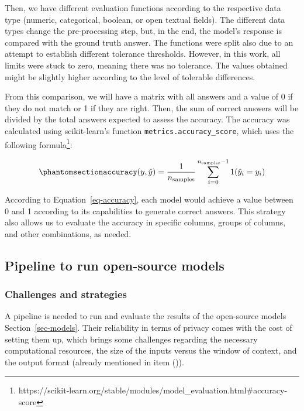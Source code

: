 \documentclass[
  12pt,
]{article}
\begin{document}
Then, we have different evaluation functions according to the respective
data type (numeric, categorical, boolean, or open textual fields). The
different data types change the pre-processing step, but, in the end,
the model's response is compared with the ground truth answer. The
functions were split also due to an attempt to establish different
tolerance thresholds. However, in this work, all limits were stuck to
zero, meaning there was no tolerance. The values obtained might be
slightly higher according to the level of tolerable differences.

From this comparison, we will have a matrix with all answers and a value
of 0 if they do not match or 1 if they are right. Then, the sum of
correct answers will be divided by the total answers expected to assess
the accuracy. The accuracy was calculated using scikit-learn's function
\texttt{metrics.accuracy\_score}, which uses the following
formula\footnote{https://scikit-learn.org/stable/modules/model\_evaluation.html\#accuracy-score}:

\begin{equation}\phantomsection\label{eq-accuracy}{
\texttt{accuracy}(y, \hat{y}) = \frac{1}{n_\text{samples}} \sum_{i=0}^{n_\text{samples}-1} 1(\hat{y}_i = y_i) 
}\end{equation}

According to Equation~\ref{eq-accuracy}, each model would achieve a
value between 0 and 1 according to its capabilities to generate correct
answers. This strategy also allows us to evaluate the accuracy in
specific columns, groups of columns, and other combinations, as needed.

\subsection{Pipeline to run open-source
models}\label{pipeline-to-run-open-source-models}

\subsubsection{Challenges and
strategies}\label{challenges-and-strategies}

A pipeline is needed to run and evaluate the results of the open-source
models Section~\ref{sec-models}. Their reliability in terms of privacy
comes with the cost of setting them up, which brings some challenges
regarding the necessary computational resources, the size of the inputs
versus the window of context, and the output format (already mentioned
in item ()).
\end{document}
